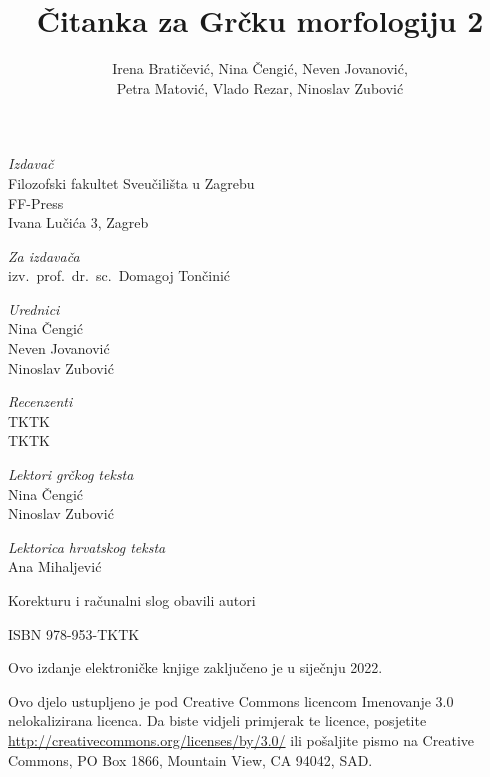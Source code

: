 \documentclass[a4paper,12pt,twoside]{report}
\def\secondpage{\clearpage\null\vfill
\pagestyle{empty}
\begin{minipage}[b]{0.9\textwidth}
\begin{center}
\textit{Izdavač}\\
Filozofski fakultet Sveučilišta u Zagrebu\\
FF-Press\\
Ivana Lučića 3, Zagreb

\bigskip

\textit{Za izdavača}\\
izv.\ prof.\ dr.\ sc.\ Domagoj Tončinić

\bigskip

\textit{Urednici}\\
Nina Čengić\\
Neven Jovanović\\
Ninoslav Zubović

\bigskip

\textit{Recenzenti}\\
TKTK\\
TKTK

\bigskip

\textit{Lektori grčkog teksta}\\
Nina Čengić\\
Ninoslav Zubović

\textit{Lektorica hrvatskog teksta}\\
Ana Mihaljević

\bigskip

Korekturu i računalni slog obavili autori

\bigskip

ISBN 978-953-TKTK

\bigskip

Ovo izdanje elektroničke knjige zaključeno je u siječnju 2022.




\end{center}
\footnotesize\raggedright
\setlength{\parskip}{0.5\baselineskip}
\noindent Ovo djelo ustupljeno je pod Creative Commons licencom Imenovanje 3.0 nelokalizirana licenca. Da biste vidjeli primjerak te licence, posjetite \url{http://creativecommons.org/licenses/by/3.0/} ili pošaljite pismo na Creative Commons, PO Box 1866, Mountain View, CA 94042, SAD. 

\end{minipage}
\vspace*{3\baselineskip}
}
\begin{document}
\title{Čitanka za Grčku morfologiju 2}
\author{Irena Bratičević, Nina Čengić, Neven Jovanović, \\Petra Matović, Vlado Rezar, Ninoslav Zubović}
\date{}
\secondpage
\end{document}
